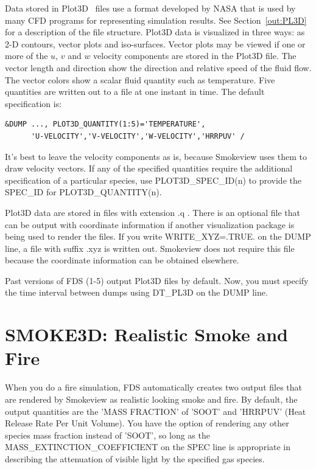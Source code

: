 \documentclass[11pt]{book}
\begin{document}
Data stored in Plot3D~\cite{PLOT3D} files use a format developed by NASA that is used by many CFD programs for representing simulation results. See Section~\ref{out:PL3D} for a description of the file structure. Plot3D data is visualized in three ways: as 2-D contours, vector plots and iso-surfaces. Vector plots may be viewed if one or more of the $u$, $v$ and $w$ velocity components are stored in the Plot3D file. The vector length and direction show the direction and relative speed of the fluid flow. The vector colors show a scalar fluid quantity such as temperature. Five quantities are written out to a file at one instant in time. The default specification is:
\begin{lstlisting}
&DUMP ..., PLOT3D_QUANTITY(1:5)='TEMPERATURE',
      'U-VELOCITY','V-VELOCITY','W-VELOCITY','HRRPUV' /
\end{lstlisting}
It's best to leave the velocity components as is, because Smokeview uses them to draw velocity vectors. If any of the specified quantities require the additional specification of a particular species, use {\ct PLOT3D\_SPEC\_ID(n)} to provide the {\ct SPEC\_ID} for {\ct PLOT3D\_QUANTITY(n)}.

Plot3D data are stored in files with extension {\ct .q} . There is an optional file that can be output with coordinate information if another visualization package is being used to render the files. If you write {\ct WRITE\_XYZ=.TRUE.} on the {\ct DUMP} line, a file with suffix {\ct .xyz} is written out. Smokeview does not require this file because the coordinate information can be obtained elsewhere.

Past versions of FDS (1-5) output Plot3D files by default. Now, you must specify the time interval between dumps using {\ct DT\_PL3D} on the {\ct DUMP} line.



\section{SMOKE3D: Realistic Smoke and Fire}
\label{info:SMOKE3D}

When you do a fire simulation, FDS automatically creates two output files that are rendered by Smokeview as realistic looking smoke and fire. By default, the output quantities are the {\ct 'MASS FRACTION'} of {\ct 'SOOT'} and {\ct 'HRRPUV'} (Heat Release Rate Per Unit Volume). You have the option of rendering any other species mass fraction instead of {\ct 'SOOT'}, so long as the {\ct MASS\_EXTINCTION\_COEFFICIENT} on the {\ct SPEC} line is appropriate in
describing the attenuation of visible light by the specified gas species.
\end{document}
